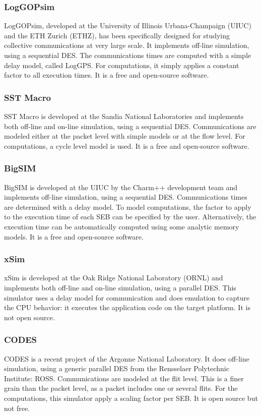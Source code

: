 \documentclass[12pt, a4paper]{memoir}
\begin{document}
\subsubsection{LogGOPsim}
\label{sec:orgfcf5df0}
LogGOPsim\cite{loggopsim_10}, developed at the University of Illinois Urbana-Champaign (UIUC) and the ETH Zurich
(ETHZ), has been specifically designed for studying collective communications at very large scale. It implements
off-line simulation, using a sequential DES.  The communications times are computed with a simple delay model,
called LogGPS. For computations, it simply applies a constant factor to all execution times. It is a free and
open-source software.
\subsubsection{SST Macro}
\label{sec:orgcdb8061}
SST Macro\cite{sstmacro} is developed at the Sandia National Laboratories and implements both off-line and on-line
simulation, using a sequential DES.  Communications are modeled either at the packet level with simple models or at
the flow level. For computations, a cycle level model is used. It is a free and open-source software.
\subsubsection{BigSIM}
\label{sec:org732f814}
BigSIM\cite{bigsim_04} is developed at the UIUC by the Charm++ development team and implements off-line simulation,
using a sequential DES.  Communications times are determined with a delay model. To model computations, the factor
to apply to the execution time of each SEB can be specified by the user. Alternatively, the execution time can be
automatically computed using some analytic memory models. It is a free and open-source software.
\subsubsection{xSim}
\label{sec:orgf4acd09}
xSim\cite{xsim} is developed at the Oak Ridge National Laboratory (ORNL) and implements both off-line and on-line
simulation, using a parallel DES.  This simulator uses a delay model for communication and does emulation to
capture the CPU behavior: it executes the application code on the target platform. It is not open source.
\subsubsection{CODES}
\label{sec:org4cfdd6c}
CODES\cite{CODES} is a recent project of the Argonne National Laboratory. It does off-line simulation, using a
generic parallel DES from the Rensselaer Polytechnic Institute: ROSS.  Communications are modeled at the flit
level. This is a finer grain than the packet level, as a packet includes one or several flits. For the
computations, this simulator apply a scaling factor per SEB. It is open source but not free.
\end{document}
